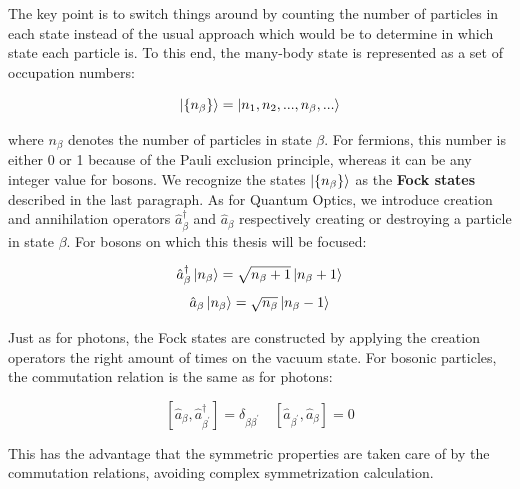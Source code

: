 The key point is to switch things around by counting the number of particles in each state instead of the usual approach which would be to determine in which state each particle is. To this end, the many-body state is represented as a set of occupation numbers:

\begin{equation}
   \ket{ \{n_{\beta}\}} = \ket{n_1,n_2,...,n_{\beta},...}
\end{equation}

\noindent where $n_{\beta}$ denotes the number of particles in state $\beta$. For fermions, this number is either 0 or 1 because of the Pauli exclusion principle, whereas it can be any integer value for bosons. We recognize the states $\ket{ \{n_{\beta}\}}$ as the \textbf{Fock states} described in the last paragraph. As for Quantum Optics, we introduce creation and annihilation operators $\hat{a}^{\dagger}_{\beta}$ and $\hat{a}_{\beta}$ respectively creating or destroying a particle in state $\beta$. For bosons on which this thesis will be focused:

\begin{equation}
    \hat{a}_{\beta}^{\dagger} \ket{n_{\beta}}=\sqrt{n_{\beta}+1}\left|n_{\beta}+1\right\rangle
\end{equation}
\begin{equation}
    \hat{a}_{\beta} \ket{n_{\beta}}=\sqrt{n_{\beta}}\left|n_{\beta}-1\right\rangle
\end{equation}

Just as for photons, the Fock states are constructed by applying the creation operators the right amount of times on the vacuum state. For bosonic particles, the commutation relation is the same as for photons:

\begin{equation}
    \left[\hat{a}_{\beta}, \hat{a}_{\beta^{\prime}}^{\dagger}\right]=\delta_{\beta \beta^{\prime}} \quad\left[\hat{a}_{\beta^{\prime}}, \hat{a}_{\beta}\right]=0
\end{equation}

\noindent This has the advantage that the symmetric properties are taken care of by the commutation relations, avoiding complex symmetrization calculation. 


